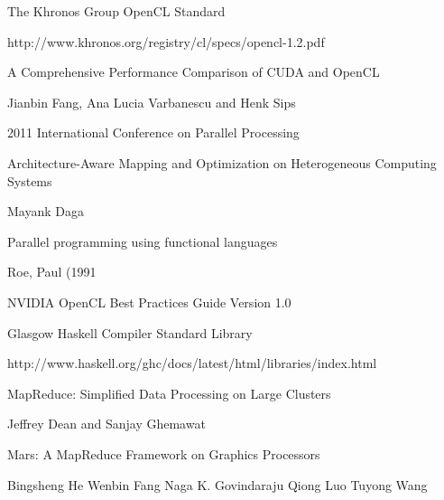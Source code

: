 \documentclass[11pt,a4paper,twocolumn] {scrartcl}   %
\begin{document}
\maketitle
{}

\pagebreak{}








\begin{thebibliography}{9}

\thispagestyle{empty}
\pagestyle{empty}
    The Khronos Group OpenCL Standard

    http://www.khronos.org/registry/cl/specs/opencl-1.2.pdf

    A Comprehensive Performance Comparison of
    CUDA and OpenCL

    Jianbin Fang, Ana Lucia Varbanescu and Henk Sips

    2011 International Conference on Parallel Processing

    Architecture-Aware Mapping and Optimization on Heterogeneous Computing Systems

    Mayank Daga

    Parallel programming using functional languages

    Roe, Paul (1991

    NVIDIA OpenCL Best Practices Guide Version 1.0

    Glasgow Haskell Compiler Standard Library

    http://www.haskell.org/ghc/docs/latest/html/libraries/index.html

    MapReduce: Simplified Data Processing on Large Clusters

    Jeffrey Dean and Sanjay Ghemawat

  Mars: A MapReduce Framework on Graphics Processors

  Bingsheng He Wenbin Fang Naga K. Govindaraju Qiong Luo Tuyong Wang


\end{thebibliography}
\end{document}
